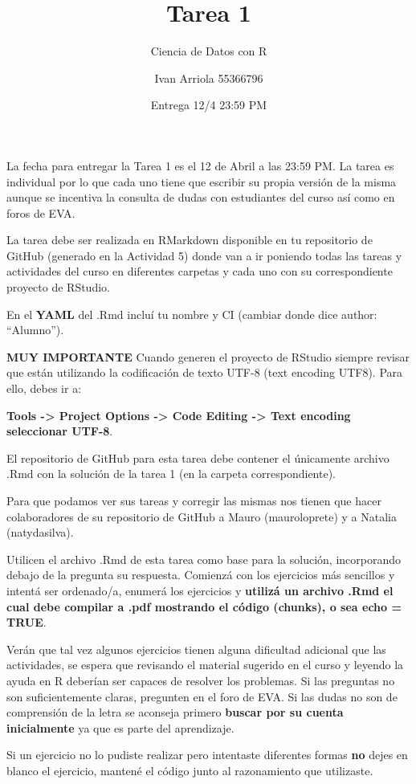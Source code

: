 \documentclass[
]{article}
\title{Tarea 1}
\subtitle{Ciencia de Datos con R}
\author{Ivan Arriola 55366796}
\date{Entrega 12/4 23:59 PM}
\begin{document}
\maketitle

La fecha para entregar la Tarea 1 es el 12 de Abril a las 23:59 PM. La
tarea es individual por lo que cada uno tiene que escribir su propia
versión de la misma aunque se incentiva la consulta de dudas con
estudiantes del curso así como en foros de EVA.

La tarea debe ser realizada en RMarkdown disponible en tu repositorio de
GitHub (generado en la Actividad 5) donde van a ir poniendo todas las
tareas y actividades del curso en diferentes carpetas y cada uno con su
correspondiente proyecto de RStudio.

En el \textbf{YAML} del .Rmd incluí tu nombre y CI (cambiar donde dice
author: ``Alumno'').

\textbf{MUY IMPORTANTE} Cuando generen el proyecto de RStudio siempre
revisar que están utilizando la codificación de texto UTF-8 (text
encoding UTF8). Para ello, debes ir a:

\textbf{Tools -\textgreater{} Project Options -\textgreater{} Code
Editing -\textgreater{} Text encoding seleccionar UTF-8}.

El repositorio de GitHub para esta tarea debe contener el únicamente
archivo .Rmd con la solución de la tarea 1 (en la carpeta
correspondiente).

Para que podamos ver sus tareas y corregir las mismas nos tienen que
hacer colaboradores de su repositorio de GitHub a Mauro (mauroloprete) y
a Natalia (natydasilva).

Utilicen el archivo .Rmd de esta tarea como base para la solución,
incorporando debajo de la pregunta su respuesta. Comienzá con los
ejercicios más sencillos y intentá ser ordenado/a, enumerá los
ejercicios y \textbf{utilizá un archivo .Rmd el cual debe compilar a
.pdf mostrando el código (chunks), o sea echo = TRUE}.

Verán que tal vez algunos ejercicios tienen alguna dificultad adicional
que las actividades, se espera que revisando el material sugerido en el
curso y leyendo la ayuda en R deberían ser capaces de resolver los
problemas. Si las preguntas no son suficientemente claras, pregunten en
el foro de EVA. Si las dudas no son de comprensión de la letra se
aconseja primero \textbf{buscar por su cuenta inicialmente} ya que es
parte del aprendizaje.

Si un ejercicio no lo pudiste realizar pero intentaste diferentes formas
\textbf{no} dejes en blanco el ejercicio, mantené el código junto al
razonamiento que utilizaste.
\end{document}
